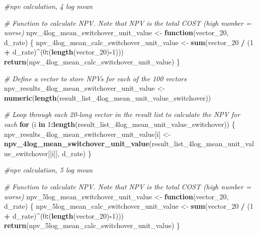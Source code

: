 \documentclass[
]{article}
\newenvironment{Shaded}{\begin{snugshade}}{\end{snugshade}}
\newcommand{\CommentTok}[1]{\textcolor[rgb]{0.56,0.35,0.01}{\textit{#1}}}
\newcommand{\ControlFlowTok}[1]{\textcolor[rgb]{0.13,0.29,0.53}{\textbf{#1}}}
\newcommand{\DecValTok}[1]{\textcolor[rgb]{0.00,0.00,0.81}{#1}}
\newcommand{\FunctionTok}[1]{\textcolor[rgb]{0.13,0.29,0.53}{\textbf{#1}}}
\newcommand{\NormalTok}[1]{#1}
\newcommand{\OtherTok}[1]{\textcolor[rgb]{0.56,0.35,0.01}{#1}}
\newcommand{\SpecialCharTok}[1]{\textcolor[rgb]{0.81,0.36,0.00}{\textbf{#1}}}
\begin{document}
\begin{Shaded}
\begin{Highlighting}[]
\CommentTok{\#npv calculation, 4 log mean}

\CommentTok{\# Function to calculate NPV. Note that NPV is the total COST (high number = worse)}
\NormalTok{npv\_4log\_mean\_switchover\_unit\_value }\OtherTok{\textless{}{-}} \ControlFlowTok{function}\NormalTok{(vector\_20, d\_rate) \{}
\NormalTok{  npv\_4log\_mean\_calc\_switchover\_unit\_value }\OtherTok{\textless{}{-}} \FunctionTok{sum}\NormalTok{(vector\_20 }\SpecialCharTok{/}\NormalTok{ (}\DecValTok{1} \SpecialCharTok{+}\NormalTok{ d\_rate)}\SpecialCharTok{\^{}}\NormalTok{(}\DecValTok{0}\SpecialCharTok{:}\NormalTok{(}\FunctionTok{length}\NormalTok{(vector\_20)}\SpecialCharTok{{-}}\DecValTok{1}\NormalTok{)))}
  \FunctionTok{return}\NormalTok{(npv\_4log\_mean\_calc\_switchover\_unit\_value)}
\NormalTok{\}}

\CommentTok{\# Define a vector to store NPVs for each of the 100 vectors}
\NormalTok{npv\_results\_4log\_mean\_switchover\_unit\_value }\OtherTok{\textless{}{-}} \FunctionTok{numeric}\NormalTok{(}\FunctionTok{length}\NormalTok{(result\_list\_4log\_mean\_unit\_value\_switchover))}

\CommentTok{\# Loop through each 20{-}long vector in the result list to calculate the NPV for each}
\ControlFlowTok{for}\NormalTok{ (i }\ControlFlowTok{in} \DecValTok{1}\SpecialCharTok{:}\FunctionTok{length}\NormalTok{(result\_list\_4log\_mean\_unit\_value\_switchover)) \{}
\NormalTok{  npv\_results\_4log\_mean\_switchover\_unit\_value[i] }\OtherTok{\textless{}{-}} \FunctionTok{npv\_4log\_mean\_switchover\_unit\_value}\NormalTok{(result\_list\_4log\_mean\_unit\_value\_switchover[[i]], d\_rate)}
\NormalTok{\}}



\CommentTok{\#npv calculation, 5 log mean}


\CommentTok{\# Function to calculate NPV. Note that NPV is the total COST (high number = worse)}
\NormalTok{npv\_5log\_mean\_switchover\_unit\_value }\OtherTok{\textless{}{-}} \ControlFlowTok{function}\NormalTok{(vector\_20, d\_rate) \{}
\NormalTok{  npv\_5log\_mean\_calc\_switchover\_unit\_value }\OtherTok{\textless{}{-}} \FunctionTok{sum}\NormalTok{(vector\_20 }\SpecialCharTok{/}\NormalTok{ (}\DecValTok{1} \SpecialCharTok{+}\NormalTok{ d\_rate)}\SpecialCharTok{\^{}}\NormalTok{(}\DecValTok{0}\SpecialCharTok{:}\NormalTok{(}\FunctionTok{length}\NormalTok{(vector\_20)}\SpecialCharTok{{-}}\DecValTok{1}\NormalTok{)))}
  \FunctionTok{return}\NormalTok{(npv\_5log\_mean\_calc\_switchover\_unit\_value)}
\NormalTok{\}}


\end{Highlighting}
\end{Shaded}
\end{document}

